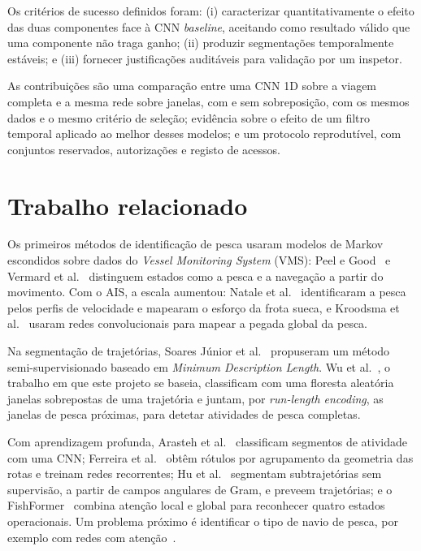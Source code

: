 \documentclass{article}
\begin{document}
Os critérios de sucesso definidos foram: (i) caracterizar quantitativamente o efeito das duas componentes face à CNN \emph{baseline}, aceitando como resultado válido que uma componente não traga ganho; (ii) produzir segmentações temporalmente estáveis; e (iii) fornecer justificações auditáveis para validação por um inspetor.

As contribuições são uma comparação entre uma CNN 1D sobre a viagem completa e a mesma rede sobre janelas, com e sem sobreposição, com os mesmos dados e o mesmo critério de seleção; evidência sobre o efeito de um filtro temporal aplicado ao melhor desses modelos; e um protocolo reprodutível, com conjuntos reservados, autorizações e registo de acessos.

\section{Trabalho relacionado}
\label{sec:relacionado}
Os primeiros métodos de identificação de pesca usaram modelos de Markov escondidos sobre dados do \emph{Vessel Monitoring System} (VMS): Peel e Good~ e Vermard et al.~ distinguem estados como a pesca e a navegação a partir do movimento. Com o AIS, a escala aumentou: Natale et al.~ identificaram a pesca pelos perfis de velocidade e mapearam o esforço da frota sueca, e Kroodsma et al.~ usaram redes convolucionais para mapear a pegada global da pesca.

Na segmentação de trajetórias, Soares Júnior et al.~ propuseram um método semi-supervisionado baseado em \emph{Minimum Description Length}. Wu et al.~, o trabalho em que este projeto se baseia, classificam com uma floresta aleatória janelas sobrepostas de uma trajetória e juntam, por \emph{run-length encoding}, as janelas de pesca próximas, para detetar atividades de pesca completas.

Com aprendizagem profunda, Arasteh et al.~ classificam segmentos de atividade com uma CNN; Ferreira et al.~ obtêm rótulos por agrupamento da geometria das rotas e treinam redes recorrentes; Hu et al.~ segmentam subtrajetórias sem supervisão, a partir de campos angulares de Gram, e preveem trajetórias; e o FishFormer~\cite{wang2026} combina atenção local e global para reconhecer quatro estados operacionais. Um problema próximo é identificar o tipo de navio de pesca, por exemplo com redes com atenção~\cite{cheng2025}.
\end{document}
